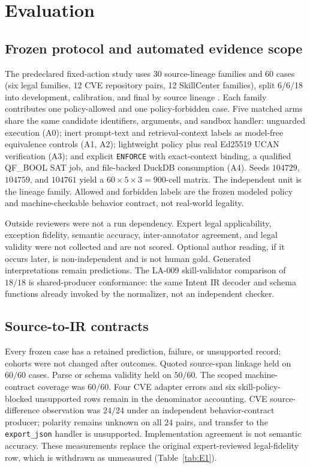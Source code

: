 \section{Evaluation}
\label{sec:eval}

\subsection{Frozen protocol and automated evidence scope}
\label{sec:eval-protocol}

The predeclared fixed-action study uses 30 source-lineage families and 60 cases (six legal families, 12 CVE repository pairs, 12 SkillCenter families), split 6/6/18 into development, calibration, and final by source lineage \citep{cvefixes}. Each family contributes one policy-allowed and one policy-forbidden case. Five matched arms share the same candidate identifiers, arguments, and sandbox handler: unguarded execution (A0); inert prompt-text and retrieval-context labels as model-free equivalence controls (A1, A2); lightweight policy plus real Ed25519 UCAN verification (A3); and explicit \texttt{ENFORCE} with exact-context binding, a qualified QF\_BOOL SAT job, and file-backed DuckDB consumption (A4). Seeds $104729$, $104759$, and $104761$ yield a $60\times 5\times 3=900$-cell matrix. The independent unit is the lineage family. Allowed and forbidden labels are the frozen modeled policy and machine-checkable behavior contract, not real-world legality.

Outside reviewers were not a run dependency. Expert legal applicability, exception fidelity, semantic accuracy, inter-annotator agreement, and legal validity were not collected and are not scored. Optional author reading, if it occurs later, is non-independent and is not human gold. Generated interpretations remain predictions. The LA-009 skill-validator comparison of $18/18$ is shared-producer conformance: the same Intent IR decoder and schema functions already invoked by the normalizer, not an independent checker.

\subsection{Source-to-IR contracts}
\label{sec:eval-source}

Every frozen case has a retained prediction, failure, or unsupported record; cohorts were not changed after outcomes. Quoted source-span linkage held on $60/60$ cases. Parse or schema validity held on $50/60$. The scoped machine-contract coverage was $60/60$. Four CVE adapter errors and six skill-policy-blocked unsupported rows remain in the denominator accounting. CVE source-difference observation was $24/24$ under an independent behavior-contract producer; polarity remains unknown on all $24$ pairs, and transfer to the \texttt{export\_json} handler is unsupported. Implementation agreement is not semantic accuracy. These measurements replace the original expert-reviewed legal-fidelity row, which is withdrawn as unmeasured (Table~\ref{tab:E1}).

